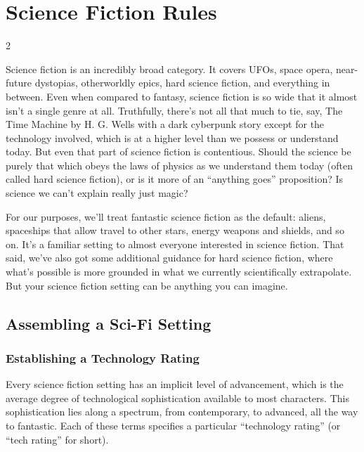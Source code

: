 \part{Science Fiction Rules}

\begin{multicols}{2}

Science fiction is an incredibly broad category. It covers UFOs, space opera, near-future dystopias, otherworldly epics, hard science fiction, and everything in between. Even when compared to fantasy, science fiction is so wide that it almost isn’t a single genre at all. Truthfully, there’s not all that much to tie, say, The Time Machine by H. G. Wells with a dark cyberpunk story except for the technology involved, which is at a higher level than we possess or understand today. But even that part of science fiction is contentious. Should the science be purely that which obeys the laws of physics as we understand them today (often called hard science fiction), or is it more of an “anything goes” proposition? Is science we can’t explain really just magic?

For our purposes, we’ll treat fantastic science fiction as the default: aliens, spaceships that allow travel to other stars, energy weapons and shields, and so on. It’s a familiar setting to almost everyone interested in science fiction. That said, we’ve also got some additional guidance for hard science fiction, where what’s possible is more grounded in what we currently scientifically extrapolate. But your science fiction setting can be anything you can imagine.

\chapter{Assembling a Sci-Fi Setting}

\section{Establishing a Technology Rating}

Every science fiction setting has an implicit level of advancement, which is the average degree of technological sophistication available to most characters. This sophistication lies along a spectrum, from contemporary, to advanced, all the way to fantastic. Each of these terms specifies a particular “technology rating” (or “tech rating” for short). 


\end{multicols}

